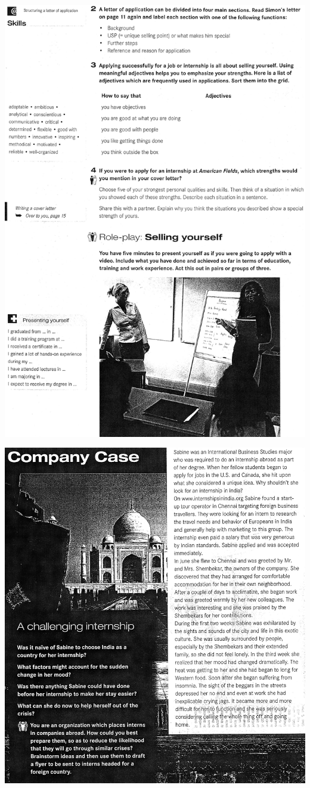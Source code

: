\includegraphics[scale=.85]{handouts/Eng407.jpg}

\includegraphics[scale=.85]{handouts/Eng409.jpg}

